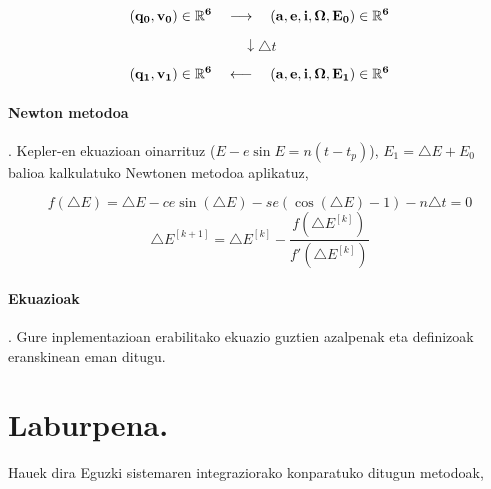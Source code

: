 \begin{equation*}
(\bf{q_0},\bf{v_0}) \in \mathbb{R}^6 \ \ \ \longrightarrow \ \ \  (a,e,i,\Omega,E_0) \in \mathbb{R}^6 
\end{equation*}

\begin{equation*}
\downarrow \triangle t
\end{equation*}

\begin{equation*}
(\bf{q_1},\bf{v_1}) \in \mathbb{R}^6 \ \ \ \longleftarrow \ \ \  (a,e,i,\Omega,E_1) \in \mathbb{R}^6 
\end{equation*}

\paragraph*{\textbf{Newton metodoa}}. Kepler-en ekuazioan oinarrituz ($E-e\sin E=n (t-t_p)$),  $E_1=\triangle E+E_0$ balioa kalkulatuko Newtonen metodoa aplikatuz,

\begin{equation*}
f(\triangle E)=\triangle E - ce \sin(\triangle E)- se (\cos(\triangle E)-1)-n \triangle t=0
\end{equation*}
\begin{equation}
\triangle E^{[k+1]}=\triangle E^{[k]}- \frac{f(\triangle E^{[k]})}{f'(\triangle E^{[k]})}
\end{equation}

\paragraph*{\textbf{Ekuazioak}}. Gure inplementazioan erabilitako ekuazio guztien azalpenak eta definizoak eranskinean eman ditugu.

\section{Laburpena.}

Hauek dira Eguzki sistemaren integraziorako konparatuko ditugun metodoak,

